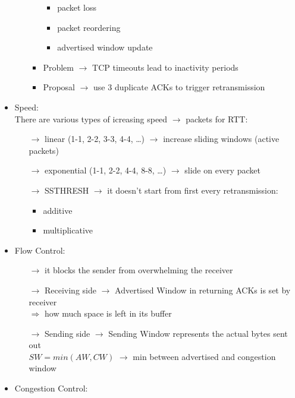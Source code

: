\begin{itemize}
\begin{itemize}
\begin{itemize}
\begin{itemize}
                \item packet loss
                \item packet reordering
                \item advertised window update
            \end{itemize}
            \item Problem $\rightarrow$ TCP timeouts lead to inactivity periods
            \item Proposal $\rightarrow$ use 3 duplicate ACKs to trigger retransmission
        \end{itemize}
    \end{itemize}
    \item Speed:\\[0.2cm]
    There are various types of icreasing speed $\rightarrow$ packets for RTT:
    \begin{itemize}
        \item[$\rightarrow$] linear (1-1, 2-2, 3-3, 4-4, \dots) $\rightarrow$ increase sliding windows (active packets)
        \item[$\rightarrow$] exponential (1-1, 2-2, 4-4, 8-8, \dots) $\rightarrow$ slide on every packet
        \item[$\rightarrow$] SSTHRESH $\rightarrow$ it doesn't start from first every retransmission:
        \begin{itemize}
            \item additive 
            \item multiplicative
        \end{itemize}
    \end{itemize}
    \item Flow Control:
    \begin{itemize}
        \item[$\rightarrow$] it blocks the sender from overwhelming the receiver
        \item[$\rightarrow$] Receiving side $\rightarrow$ Advertised Window in returning ACKs is set by receiver\\
        $\Rightarrow$ how much space is left in its buffer
        \item[$\rightarrow$] Sending side $\rightarrow$ Sending Window represents the actual bytes sent out\\
        $SW = min(AW, CW)$ $\rightarrow$ min between advertised and congestion window
    \end{itemize}
    \item Congestion Control:
    \begin{itemize}

\end{itemize}
\end{itemize}
